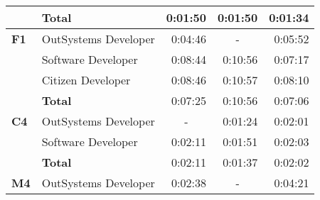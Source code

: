 \begin{table}[tb]
\begin{tabular}{llrrr}
                              & \textbf{Total}       & 0:01:50                                                           & 0:01:50                                                                 & 0:01:34                                                       \\ \hline
    \textbf{F1}               & OutSystems Developer & 0:04:46                                                           & \multicolumn{1}{c}{-}                                                   & 0:05:52                                                       \\
                              & Software Developer   & 0:08:44                                                           & 0:10:56                                                                 & 0:07:17                                                       \\
                              & Citizen Developer    & 0:08:46                                                           & 0:10:57                                                                 & 0:08:10                                                       \\
                              & \textbf{Total}       & 0:07:25                                                           & 0:10:56                                                                 & 0:07:06                                                       \\ \hline
    \textbf{C4}               & OutSystems Developer & \multicolumn{1}{c}{-}                                             & 0:01:24                                                                 & 0:02:01                                                       \\
                              & Software Developer   & 0:02:11                                                           & 0:01:51                                                                 & 0:02:03                                                       \\
                              & \textbf{Total}       & 0:02:11                                                           & 0:01:37                                                                 & 0:02:02                                                       \\ \hline
    \textbf{M4}               & OutSystems Developer & 0:02:38                                                           & \multicolumn{1}{c}{-}                                                   & 0:04:21                                                       \\

\end{tabular}
\end{table}
